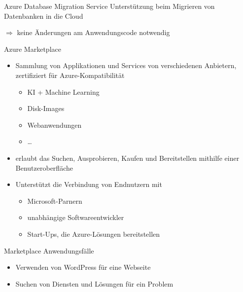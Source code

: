 \begin{flashcard}[Describe]{Azure Database Migration Service}
    Unterstützung beim Migrieren von Datenbanken in die Cloud

    $\Rightarrow$ keine Änderungen am Anwendungscode notwendig
\end{flashcard}

\begin{flashcard}[Definition]{Azure Marketplace}
    \begin{itemize}
        \item Sammlung von Applikationen und Services\newline
        von verschiedenen Anbietern, zertifiziert für Azure-Kompatibilität
        \begin{itemize}
            \item KI + Machine Learning
            \item Disk-Images
            \item Webanwendungen
            \item \ldots
        \end{itemize}
        \item erlaubt das Suchen, Ausprobieren, Kaufen und Bereitstellen mithilfe einer Benutzeroberfläche
        \item Unterstützt die Verbindung von Endnutzern mit
        \begin{itemize}
            \item Microsoft-Parnern
            \item unabhängige Softwareentwickler
            \item Start-Ups, die Azure-Lösungen bereitstellen
        \end{itemize}
    \end{itemize}
\end{flashcard}

\begin{flashcard}[\ ]{Marketplace Anwendungsfälle}
        \begin{itemize}
            \item Verwenden von WordPress für eine Webseite
            \item Suchen von Diensten und Lösungen für ein Problem
        \end{itemize}
\end{flashcard}

